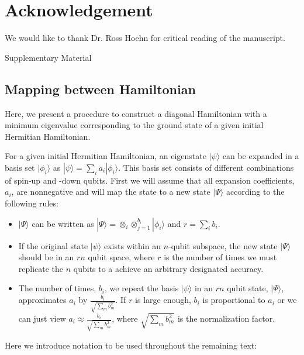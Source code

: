 \documentclass{article}
\begin{document}
\section*{Acknowledgement}

We would like to thank Dr. Ross  Hoehn for critical reading of the manuscript.






\newpage
\begin{center}
\LARGE{Supplementary Material}
\end{center}

\subsection*{Mapping between Hamiltonian}
Here, we present a procedure to construct a diagonal Hamiltonian with a minimum eigenvalue corresponding to the ground state of a given initial Hermitian Hamiltonian. 


For a given initial Hermitian Hamiltonian, an eigenstate $|\psi\rangle$ can be expanded in a basis set $|\phi_i\rangle$ as $|\psi\rangle=\sum_i a_i|\phi_i\rangle$. This basis set consists of different combinations of spin-up and -down qubits.  First we will assume that all expansion coefficients, $a_i$, are nonnegative and will map the state to a new state $|\Psi\rangle$ according to the following rules:

\begin{itemize}
\item $|\Psi\rangle$ can be written as $|\Psi\rangle=\otimes_i\otimes_{j=1}^{b_i}|\phi_i\rangle$ and $r=\sum_ib_i$.
\item If the original state $|\psi\rangle$ exists within an $n$-qubit subspace, the new state $|\Psi\rangle$ should be in an $r n$ qubit space, where $r$ is the number of times we must replicate the $n$ qubits to a achieve an arbitrary designated accuracy.
\item The number of times, $b_i$, we repeat the basis $|\psi\rangle$ in an $rn$ qubit state, $|\Psi\rangle$, approximates $a_i$ by $\frac{b_i}{\sqrt{\sum_mb_m^2}}$. If $r$ is large enough, $b_i$ is proportional to $a_i$ or we can just view $a_i \approx \frac{b_i}{\sqrt{\sum_m b_m^2}}$, where $\sqrt{\sum_m b_m^2}$ is the normalization factor.
\end{itemize}

Here we introduce notation to be used throughout the remaining text:
\end{document}
